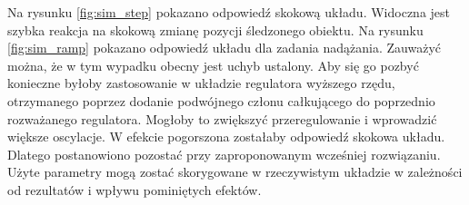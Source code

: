 Na rysunku \ref{fig:sim_step} pokazano odpowiedź skokową układu.
Widoczna jest szybka reakcja na skokową zmianę pozycji śledzonego obiektu.
Na rysunku \ref{fig:sim_ramp} pokazano odpowiedź układu dla zadania nadążania.
Zauważyć można, że w tym wypadku obecny jest uchyb ustalony.
Aby się go pozbyć konieczne byłoby zastosowanie w układzie regulatora wyższego rzędu, otrzymanego poprzez dodanie podwójnego członu całkującego do poprzednio rozważanego regulatora.
Mogłoby to zwiększyć przeregulowanie i wprowadzić większe oscylacje.
W efekcie pogorszona zostałaby odpowiedź skokowa układu.
Dlatego postanowiono pozostać przy zaproponowanym wcześniej rozwiązaniu.
Użyte parametry mogą zostać skorygowane w rzeczywistym układzie w zależności od rezultatów i wpływu pominiętych efektów.
